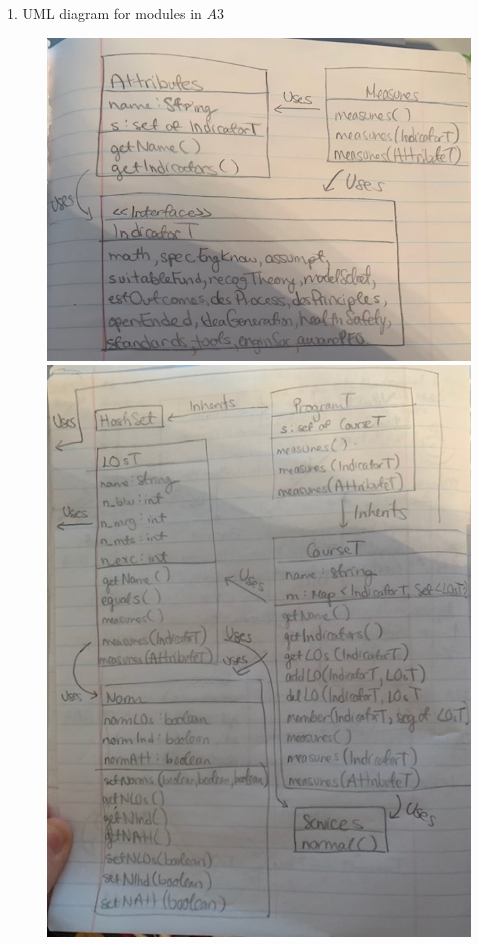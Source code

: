 \documentclass[12pt]{article}
\begin{document}
\item 1. UML diagram for modules in $A3$

\begin{figure}[ht]
\centering
\begin{minipage}[b]{0.45\linewidth}
	\includegraphics[scale=0.3]{IMG_3018}
\end{minipage}
	\quad
\begin{minipage}[b]{0.45\linewidth}
	\includegraphics[scale=0.3]{IMG_3017}
\end{minipage}
\end{figure}
\end{document}
